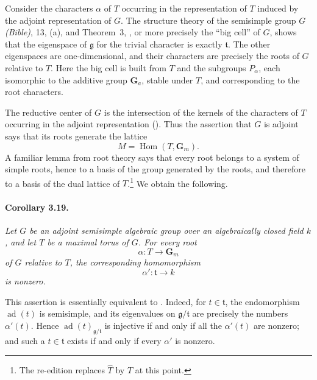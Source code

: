 Consider the characters \(\alpha\) of \(T\) occurring in the
representation of \(T\) induced by the adjoint representation of
\(G\). The structure theory of the semisimple group \(G\)
\textup{\emph{(Bible)}, 13, \textup{(a)}, and Theorem~3,
}, or more precisely the ``big cell'' of \(G\), shows
that the eigenspace of \(\mathfrak g\) for the trivial character is
exactly \(\mathfrak t\). The other eigenspaces are
one-dimensional, and their characters are precisely the roots of
\(G\) relative to \(T\). Here the big cell is built from \(T\) and
the subgroups \(P_\alpha\), each isomorphic to the additive group
\(\mathbf G_a\), stable under \(T\), and corresponding to the root
characters.

The reductive center of \(G\) is the intersection of the kernels
of the characters of \(T\) occurring in the adjoint representation
\textup{()}. Thus the assertion that \(G\) is adjoint says
that its roots generate the lattice
\[
  M=\operatorname{Hom}(T,\mathbf G_m).
\]
A familiar lemma from root theory says that every root belongs to
a system of simple roots, hence to a basis of the group generated
by the roots, and therefore to a basis of the dual lattice of
\(T\).\footnote{The re-edition replaces \(\widehat T\) by \(T\)
at this point.} We obtain the following.

\paragraph{\textbf{Corollary 3.19.}}
{\itshape Let \(G\) be an adjoint semisimple algebraic group over
an algebraically closed field \(k\), and let \(T\) be a maximal
torus of \(G\). For every root
\[
  \alpha\colon T\longrightarrow\mathbf G_m
\]
of \(G\) relative to \(T\), the corresponding homomorphism
\[
  \alpha'\colon\mathfrak t\longrightarrow k
\]
is nonzero.}

This assertion is essentially equivalent to . Indeed,
for \(t\in\mathfrak t\), the endomorphism
\(\operatorname{ad}(t)\) is semisimple, and its eigenvalues on
\(\mathfrak g/\mathfrak t\) are precisely the numbers
\(\alpha'(t)\). Hence
\(\operatorname{ad}(t)_{\mathfrak g/\mathfrak t}\) is injective if
and only if all the \(\alpha'(t)\) are nonzero; and such a
\(t\in\mathfrak t\) exists if and only if every \(\alpha'\) is
nonzero.


